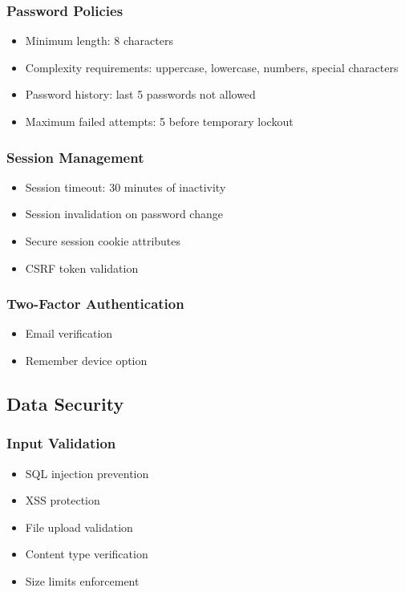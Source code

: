 \subsubsection{Password Policies}
\begin{itemize}
    \item Minimum length: 8 characters
    \item Complexity requirements: uppercase, lowercase, numbers, special characters
    \item Password history: last 5 passwords not allowed
    \item Maximum failed attempts: 5 before temporary lockout
\end{itemize}

\subsubsection{Session Management}
\begin{itemize}
    \item Session timeout: 30 minutes of inactivity
    \item Session invalidation on password change
    \item Secure session cookie attributes
    \item CSRF token validation
\end{itemize}

\subsubsection{Two-Factor Authentication}
\begin{itemize}
    \item Email verification
    \item Remember device option
\end{itemize}

\subsection{Data Security}

\subsubsection{Input Validation}
\begin{itemize}
    \item SQL injection prevention
    \item XSS protection
    \item File upload validation
    \item Content type verification
    \item Size limits enforcement
\end{itemize}

